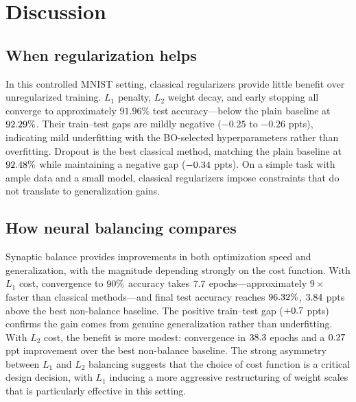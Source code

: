 
\section{Discussion}
\label{sec:discussion}

\subsection{When regularization helps}
In this controlled MNIST setting, classical regularizers provide little benefit over unregularized training. $L_1$ penalty, $L_2$ weight decay, and early stopping all converge to approximately $91.96\%$ test accuracy---below the plain baseline at $92.29\%$. Their train--test gaps are mildly negative ($-0.25$ to $-0.26$ ppts), indicating mild underfitting with the BO-selected hyperparameters rather than overfitting. Dropout is the best classical method, matching the plain baseline at $92.48\%$ while maintaining a negative gap ($-0.34$ ppts). On a simple task with ample data and a small model, classical regularizers impose constraints that do not translate to generalization gains.

\subsection{How neural balancing compares}
Synaptic balance provides improvements in both optimization speed and generalization, with the magnitude depending strongly on the cost function. With $L_1$ cost, convergence to $90\%$ accuracy takes $7.7$ epochs---approximately $9\times$ faster than classical methods---and final test accuracy reaches $96.32\%$, $3.84$ ppts above the best non-balance baseline. The positive train--test gap ($+0.7$ ppts) confirms the gain comes from genuine generalization rather than underfitting. With $L_2$ cost, the benefit is more modest: convergence in $38.3$ epochs and a $0.27$ ppt improvement over the best non-balance baseline. The strong asymmetry between $L_1$ and $L_2$ balancing suggests that the choice of cost function is a critical design decision, with $L_1$ inducing a more aggressive restructuring of weight scales that is particularly effective in this setting.

